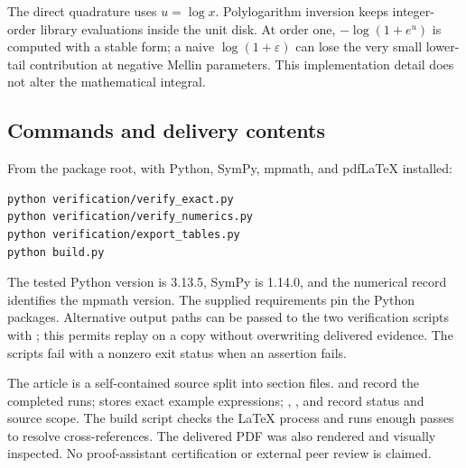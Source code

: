 The direct quadrature uses $u=\log x$. Polylogarithm inversion keeps
integer-order library evaluations inside the unit disk. At order one,
$-\log(1+e^u)$ is computed with a stable  form; a naive
$\log(1+\varepsilon)$ can lose the very small lower-tail contribution at
negative Mellin parameters. This implementation detail does not alter
the mathematical integral.

\subsection{Commands and delivery contents}
From the package root, with Python, SymPy, mpmath, and pdfLaTeX installed:
\begin{verbatim}
python verification/verify_exact.py
python verification/verify_numerics.py
python verification/export_tables.py
python build.py
\end{verbatim}
The tested Python version is 3.13.5, SymPy is 1.14.0, and the numerical
record identifies the mpmath version. The supplied requirements pin the
Python packages. Alternative output paths can be passed to the two
verification scripts with ; this permits replay on a copy
without overwriting delivered evidence. The scripts fail with a nonzero
exit status when an assertion fails.

The article is a self-contained source split into section files.
 and 
record the completed runs;  stores exact
example expressions; , , and
 record status and source scope.
The build script checks the LaTeX process and runs enough passes to
resolve cross-references. The delivered PDF was also rendered and
visually inspected. No proof-assistant certification or external peer
review is claimed.
